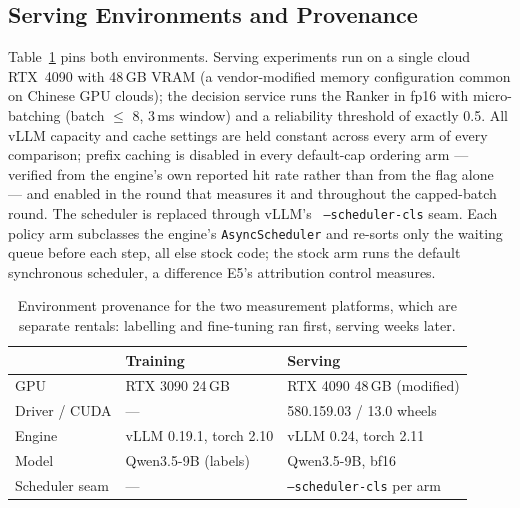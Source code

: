 \subsection{Serving Environments and Provenance}
Table~\ref{tab:envs} pins both environments. Serving experiments
run on a single cloud RTX~4090 with 48\,GB VRAM (a vendor-modified memory
configuration common on Chinese GPU clouds); the decision service runs the
Ranker in fp16 with micro-batching (batch $\le$ 8, 3\,ms window) and a
reliability threshold of exactly 0.5. All vLLM capacity and cache settings
are held constant across every arm of every comparison; prefix caching is
disabled in every default-cap ordering arm --- verified from the engine's own
reported hit rate rather than from the flag alone --- and enabled in the
round that measures it and throughout the capped-batch round. The scheduler is
replaced through vLLM's~\cite{vllm2023} \texttt{--scheduler-cls} seam. Each
policy arm subclasses the engine's \texttt{AsyncScheduler} and re-sorts only
the waiting queue before each step, all else stock code; the stock arm runs
the default synchronous scheduler, a difference E5's attribution control
measures.

\begin{table}[t]
  \caption{Environment provenance for the two measurement platforms, which
  are separate rentals: labelling and fine-tuning ran first, serving weeks
  later.}
  \label{tab:envs}
  \centering\footnotesize
  \setlength{\tabcolsep}{3.5pt}
  \begin{tabular}{@{}lll@{}}
    \toprule
     & Training & Serving \\
    \midrule
    GPU & RTX 3090 24\,GB & RTX 4090 48\,GB (modified) \\
    Driver / CUDA & --- & 580.159.03 / 13.0 wheels \\
    Engine & vLLM 0.19.1, torch 2.10 & vLLM 0.24, torch 2.11 \\
    Model & Qwen3.5-9B (labels) & Qwen3.5-9B, bf16 \\
    Scheduler seam & --- & \texttt{--scheduler-cls} per arm \\
    \bottomrule
  \end{tabular}
\end{table}

